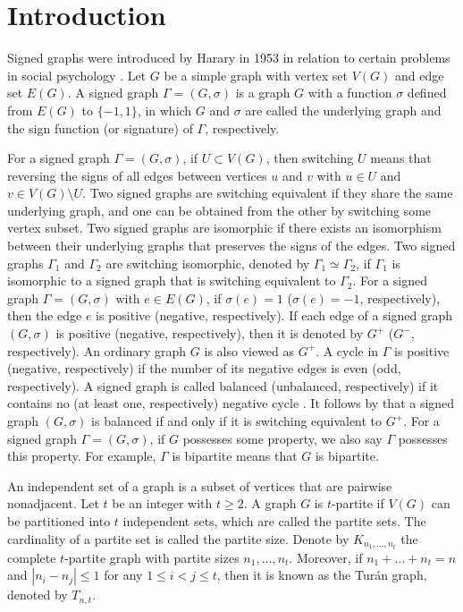\documentclass[12pt]{article}
\numberwithin{equation}{section}
\begin{document}
\section{Introduction}

Signed graphs were introduced by Harary in 1953 in relation to certain problems in social psychology \cite{Ha}. 
Let $G$ be a simple graph with vertex set $V(G)$ and edge set $E(G)$.
A signed graph $\Gamma=(G, \sigma)$ is a graph $G$ with a function $\sigma$ defined from  $E(G)$ to $\{-1,1\}$, in which $G$ and $\sigma$ are called the underlying graph and the sign function (or signature) of $\Gamma$, respectively. 

For a signed graph $\Gamma=(G,\sigma)$, if $U\subset V(G)$, then switching  $U$ means that reversing the signs of all edges between vertices $u$ and $v$ with  $u\in U$ and $v\in V(G)\setminus U$. 
Two signed graphs  are switching equivalent if they share the same underlying graph, and one can be obtained from the other by switching  some vertex subset. 
Two signed graphs are isomorphic if there exists an isomorphism between their underlying graphs that preserves the signs of the edges. 
Two signed graphs $\Gamma_1$ and $\Gamma_2$  are switching isomorphic, denoted by $\Gamma_1 \simeq \Gamma_2$, if  $\Gamma_1$ is isomorphic to a signed graph that is switching equivalent to $\Gamma_2$. 
For a signed graph $\Gamma=(G, \sigma)$ with $e\in E(G)$, if $\sigma(e)=1$ ($\sigma(e)=-1$, respectively), then the edge $e$ is positive (negative, respectively). If each edge of a signed graph $(G,\sigma)$ is positive (negative, respectively), then it is denoted by $G^+$ ($G^-$, respectively). An ordinary graph $G$ is also viewed as $G^+$. A cycle in $\Gamma$ is positive (negative, respectively) if the number of its negative edges is even (odd, respectively).
A signed graph is called balanced (unbalanced, respectively) if it contains no (at least one, respectively) negative cycle \cite{Ha,HK,Z2}.
It follows by \cite[Lemma 5.3]{Z2} that a signed graph $(G,\sigma)$ is balanced if and
only if it is switching equivalent to $G^+$. For a signed graph $\Gamma=(G,\sigma)$, if $G$ possesses some property, we also say $\Gamma$ possesses this property. For example, $\Gamma$ is bipartite means that $G$ is bipartite.


An independent set of a graph is a subset of vertices that are pairwise nonadjacent.
Let $t$ be an integer with $t\ge2$. A graph $G$ is $t$-partite if $V(G)$ can be partitioned into $t$ independent sets,  which are called the partite sets. The cardinality of a partite set is called the partite size. 
Denote by $K_{n_1,\dots,n_t}$ the complete $t$-partite graph with partite sizes  $n_1,\dots,n_t$. Moreover, if $n_1+\dots+n_t=n$ and $|n_i-n_j|\le1$ for any $1\le i< j\le t$, then it is known as the Tur\'{a}n graph, denoted by $T_{n,t}$. 
\end{document}
